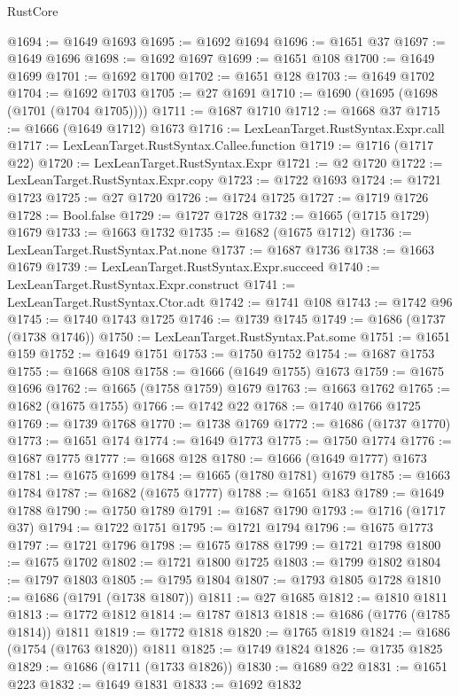 \begin{lexlean}{RustCore}
\begin{coremodule}
@1694 := @1649 @1693
@1695 := @1692 @1694
@1696 := @1651 @37
@1697 := @1649 @1696
@1698 := @1692 @1697
@1699 := @1651 @108
@1700 := @1649 @1699
@1701 := @1692 @1700
@1702 := @1651 @128
@1703 := @1649 @1702
@1704 := @1692 @1703
@1705 := @27 @1691
@1710 := @1690 (@1695 (@1698 (@1701 (@1704 @1705))))
@1711 := @1687 @1710
@1712 := @1668 @37
@1715 := @1666 (@1649 @1712) @1673
@1716 := LexLeanTarget.RustSyntax.Expr.call
@1717 := LexLeanTarget.RustSyntax.Callee.function
@1719 := @1716 (@1717 @22)
@1720 := LexLeanTarget.RustSyntax.Expr
@1721 := @2 @1720
@1722 := LexLeanTarget.RustSyntax.Expr.copy
@1723 := @1722 @1693
@1724 := @1721 @1723
@1725 := @27 @1720
@1726 := @1724 @1725
@1727 := @1719 @1726
@1728 := Bool.false
@1729 := @1727 @1728
@1732 := @1665 (@1715 @1729) @1679
@1733 := @1663 @1732
@1735 := @1682 (@1675 @1712)
@1736 := LexLeanTarget.RustSyntax.Pat.none
@1737 := @1687 @1736
@1738 := @1663 @1679
@1739 := LexLeanTarget.RustSyntax.Expr.succeed
@1740 := LexLeanTarget.RustSyntax.Expr.construct
@1741 := LexLeanTarget.RustSyntax.Ctor.adt
@1742 := @1741 @108
@1743 := @1742 @96
@1745 := @1740 @1743 @1725
@1746 := @1739 @1745
@1749 := @1686 (@1737 (@1738 @1746))
@1750 := LexLeanTarget.RustSyntax.Pat.some
@1751 := @1651 @159
@1752 := @1649 @1751
@1753 := @1750 @1752
@1754 := @1687 @1753
@1755 := @1668 @108
@1758 := @1666 (@1649 @1755) @1673
@1759 := @1675 @1696
@1762 := @1665 (@1758 @1759) @1679
@1763 := @1663 @1762
@1765 := @1682 (@1675 @1755)
@1766 := @1742 @22
@1768 := @1740 @1766 @1725
@1769 := @1739 @1768
@1770 := @1738 @1769
@1772 := @1686 (@1737 @1770)
@1773 := @1651 @174
@1774 := @1649 @1773
@1775 := @1750 @1774
@1776 := @1687 @1775
@1777 := @1668 @128
@1780 := @1666 (@1649 @1777) @1673
@1781 := @1675 @1699
@1784 := @1665 (@1780 @1781) @1679
@1785 := @1663 @1784
@1787 := @1682 (@1675 @1777)
@1788 := @1651 @183
@1789 := @1649 @1788
@1790 := @1750 @1789
@1791 := @1687 @1790
@1793 := @1716 (@1717 @37)
@1794 := @1722 @1751
@1795 := @1721 @1794
@1796 := @1675 @1773
@1797 := @1721 @1796
@1798 := @1675 @1788
@1799 := @1721 @1798
@1800 := @1675 @1702
@1802 := @1721 @1800 @1725
@1803 := @1799 @1802
@1804 := @1797 @1803
@1805 := @1795 @1804
@1807 := @1793 @1805 @1728
@1810 := @1686 (@1791 (@1738 @1807))
@1811 := @27 @1685
@1812 := @1810 @1811
@1813 := @1772 @1812
@1814 := @1787 @1813
@1818 := @1686 (@1776 (@1785 @1814)) @1811
@1819 := @1772 @1818
@1820 := @1765 @1819
@1824 := @1686 (@1754 (@1763 @1820)) @1811
@1825 := @1749 @1824
@1826 := @1735 @1825
@1829 := @1686 (@1711 (@1733 @1826))
@1830 := @1689 @22
@1831 := @1651 @223
@1832 := @1649 @1831
@1833 := @1692 @1832

\end{coremodule}
\end{lexlean}
